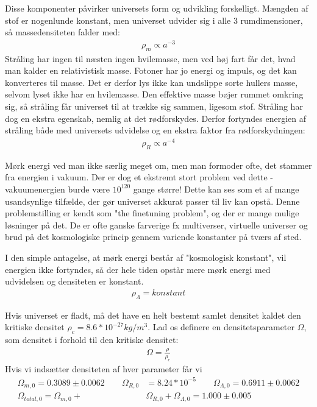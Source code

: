 Disse komponenter påvirker universets form og udvikling forskelligt. Mængden af stof er nogenlunde konstant, men universet udvider sig i alle 3 rumdimensioner, så massedensiteten falder med:
\begin{align}
\rho_m \propto a^{-3}
\end{align}
Stråling har ingen til næsten ingen hvilemasse, men ved høj fart får det, hvad man kalder en relativistisk masse. Fotoner har jo energi og impuls, og det kan konverteres til masse. Det er derfor lys ikke kan undslippe sorte hullers masse, selvom lyset ikke har en hvilemasse. Den effektive masse bøjer rummet omkring sig, så stråling får universet til at trække sig sammen, ligesom stof. Stråling har dog en ekstra egenskab, nemlig at det rødforskydes. Derfor fortyndes energien af stråling både med universets udvidelse og en ekstra faktor fra rødforskydningen:
\begin{align}
\rho_R\propto a^{-4}
\end{align}

Mørk energi ved man ikke særlig meget om, men man formoder ofte, det stammer fra energien i vakuum. Der er dog et ekstremt stort problem ved dette - vakuumenergien burde være $10^{120}$ gange større! Dette kan ses som et af mange usandsynlige tilfælde, der gør universet akkurat passer til liv kan opstå. Denne problemstilling er kendt som "the finetuning problem", og der er mange mulige løsninger på det. De er ofte ganske farverige fx multiverser, virtuelle universer og brud på det kosmologiske princip gennem variende konstanter på tværs af sted. %

I den simple antagelse, at mørk energi består af "kosmologisk konstant", vil energien ikke fortyndes, så der hele tiden opstår mere mørk energi med udvidelsen og densiteten er konstant.
\begin{align}
\rho_\Lambda = konstant
\end{align}

Hvis universet er fladt, må det have en helt bestemt samlet densitet kaldet den kritiske densitet $\rho_c = 8.6*10^{-27} kg/m^3$. Lad os definere en densitetsparameter $\Omega$, som densitet i forhold til den kritiske densitet:
\begin{align}
\Omega=\frac{\rho}{\rho_c}
\end{align}
Hvis vi indsætter densiteten af hver parameter får vi
\begin{align}
\Omega_{m,0}=0.3089\pm 0.0062\qquad
\Omega_{R,0}&=8.24*10^{-5}\qquad
\Omega_{\Lambda,0}=0.6911\pm 0.0062\\
\Omega_{total,0}=\Omega_{m,0} + &\Omega_{R,0} + \Omega_{\Lambda,0}=1.000\pm0.005 \label{Omegatot}
\end{align}

